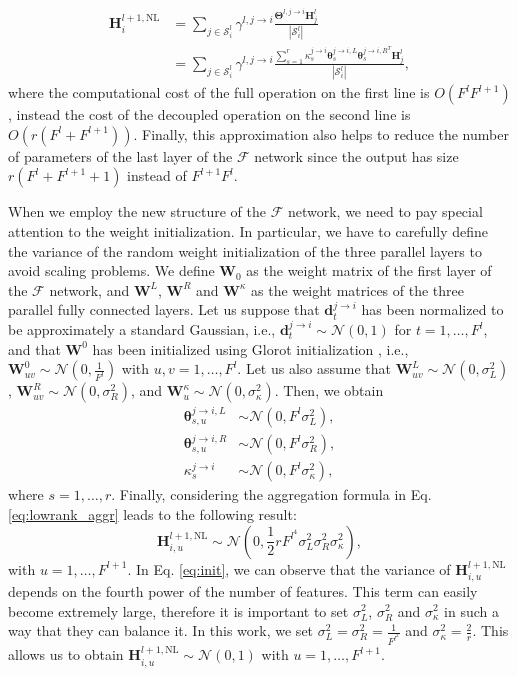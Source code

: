 \documentclass[journal]{IEEEtran}
\newcommand{\Hb}{\mathbf{H}}
\newcommand{\Wb}{\mathbf{W}}
\newcommand{\fun}{\mathcal{F}}
\newcommand{\Nc}{\mathcal{N}}
\newcommand{\Sx}{\mathcal{S}}
\begin{document}
\begin{align} \label{eq:lowrank_aggr}
\Hb_i^{l+1,\mathrm{NL}}&=\sum_{j\in\Sx_i^l} \gamma^{l,j\to i} \frac{\bm{\Theta}^{l,j\to i}\Hb_j^l}{|\Sx_i^l|} \nonumber\\
&=\sum_{j\in\Sx_i^l} \gamma^{l,j\to i} \frac{\sum_{s=1}^r\kappa_s^{j\to i}\bm{\theta}_s^{j\to i,L} \bm{\theta}_s^{j\to i,R^T}\Hb_j^l}{|\Sx_i^l|},
\end{align}
where the computational cost of the full operation on the first line is $O(F^l F^{l+1})$, instead the cost of the decoupled operation on the second line is $O(r(F^l+F^{l+1}))$.
Finally, this approximation also helps to reduce the number of parameters of the last layer of the $\fun$ network since the output has size $r(F^l+F^{l+1}+1)$ instead of $F^{l+1}F^l$.

When we employ the new structure of the $\fun$ network, we need to pay special attention to the weight initialization. In particular, we have to carefully define the variance of the random weight initialization of the three parallel layers to avoid scaling problems. We define $\Wb_0$ as the weight matrix of the first layer of the $\fun$ network, and $\Wb^L$, $\Wb^R$ and $\Wb^{\kappa}$ as the weight matrices of the three parallel fully connected layers. Let us suppose that $\mathbf{d}^{j\to i}_t$ has been normalized to be approximately a standard Gaussian, i.e., $\mathbf{d}^{j\to i}_t  \sim \Nc(0,1)$ for $t=1,\dots, F^l$, and that $\Wb^0$ has been initialized using Glorot initialization \cite{pmlr-v9-glorot10a}, i.e., $\Wb^0_{uv}\sim\Nc\left(0,\frac{1}{F^l}\right)$ with $u,v = 1,\dots, F^{l}$. Let us also assume that $\Wb^L_{uv}\sim\Nc(0,\sigma^2_L)$, $\Wb^R_{uv}\sim\Nc(0,\sigma^2_R)$, and $\Wb^{\kappa}_{u}\sim\Nc(0,\sigma^2_{\kappa})$. Then, we obtain
\[
\begin{split}
    \bm{\theta}_{s,u}^{j\to i,L}&\sim\Nc(0,F^l\sigma^2_L),\\
    \bm{\theta}_{s,u}^{j\to i,R}&\sim\Nc(0,F^l\sigma^2_R),\\
    \kappa_s^{j\to i}&\sim \Nc(0,F^l\sigma_{\kappa}^2),
\end{split}
\]
where $s=1,\dots,r$. Finally, considering the aggregation formula in Eq. \eqref{eq:lowrank_aggr} leads to the following result:
\begin{equation}
\label{eq:init}
\Hb_{i,u}^{l+1,\mathrm{NL}} \sim \Nc\left(0,\frac{1}{2}rF^{l^4}\sigma^2_L\sigma^2_R\sigma^2_{\kappa}\right),
\end{equation}
with $u=1,\dots,F^{l+1}$. In Eq. \eqref{eq:init}, we can observe that the variance of $\Hb_{i,u}^{l+1,\mathrm{NL}}$ depends on the fourth power of the number of features. This term can easily become extremely large, therefore it is important to set $\sigma^2_L$, $\sigma^2_R$ and $\sigma^2_{\kappa}$ in such a way that they can balance it. In this work, we set $\sigma^2_L=\sigma^2_R=\frac{1}{F^{l^2}}$ and $\sigma^2_{\kappa}=\frac{2}{r}$. This allows us to obtain $\Hb_{i,u}^{l+1,\mathrm{NL}}\sim \Nc(0,1)$ with $u=1,\dots, F^{l+1}$.
\end{document}
